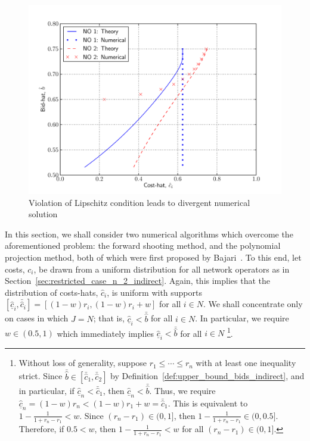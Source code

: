 \begin{figure}[t]
  \includegraphics[width=\figsize]{Indirect/Figures/lipschitz}
  \caption{Violation of Lipschitz condition leads to divergent numerical solution}
  \label{fig:lipschitz_indirect}
\end{figure}

In this section, we shall consider two numerical algorithms which overcome the aforementioned problem: the forward shooting method, and the polynomial projection method, both of which were first proposed by Bajari~\cite{Bajari2001a}. To this end, let costs, $c_i$, be drawn from a uniform distribution for all network operators as in Section~\ref{sec:restricted_case_n_2_indirect}. Again, this implies that the distribution of costs-hats, $\hat{c}_i$, is uniform with supports $[\underline{\hat{c}}_i, \bar{\hat{c}}_i] = [(1-w)r_i, (1-w)r_i + w]$ for all $i\in N$. We shall concentrate only on cases in which $J=N$; that is, $\underline{\hat{c}}_i < \bar{\hat{b}}$ for all $i\in N$. In particular, we require $w\in\left(0.5, 1\right)$ which immediately implies $\underline{\hat{c}}_i < \bar{\hat{b}}$ for all $i\in N$ \footnote{Without loss of generality, suppose $r_1\leq\cdots\leq r_n$ with at least one inequality strict. Since $\bar{\hat{b}}\in[\bar{\hat{c}}_1, \bar{\hat{c}}_2]$ by Definition~\ref{def:upper_bound_bids_indirect}, and in particular, if $\underline{\hat{c}}_n < \bar{\hat{c}}_1$, then $\underline{\hat{c}}_n < \bar{\hat{b}}$. Thus, we require $\underline{\hat{c}}_n = (1-w)r_n < (1-w)r_1 + w = \bar{\hat{c}}_1$. This is equivalent to $1 - \frac{1}{1+r_n-r_1} < w$. Since $(r_n - r_1)\in (0, 1]$, then $1 - \frac{1}{1+r_n-r_1} \in (0,0.5]$. Therefore, if $0.5 < w$, then $1 - \frac{1}{1+r_n-r_1} < w$ for all $(r_n-r_1)\in (0,1]$.}.

